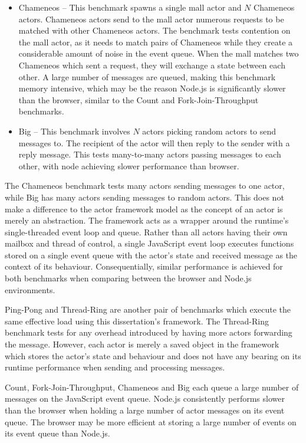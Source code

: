 \documentclass[oneside]{um-fict}
\begin{document}
\begin{itemize}
\item Chameneos – This benchmark spawns a single mall actor and $N$ Chameneos actors. Chameneos actors send to the mall actor numerous requests to be matched with other Chameneos actors. The benchmark tests contention on the mall actor, as it needs to match pairs of Chameneos while they create a considerable amount of noise in the event queue. When the mall matches two Chameneos which sent a request, they will exchange a state between each other. A large number of messages are queued, making this benchmark memory intensive, which may be the reason Node.js is significantly slower than the browser, similar to the Count and Fork-Join-Throughput benchmarks.
\item Big – This benchmark involves $N$ actors picking random actors to send messages to. The recipient of the actor will then reply to the sender with a reply message. This tests many-to-many actors passing messages to each other, with node achieving slower performance than browser.
\end{itemize}
The Chameneos benchmark tests many actors sending messages to one actor, while Big has many actors sending messages to random actors. This does not make a difference to the actor framework model as the concept of an actor is merely an abstraction. The framework acts as a wrapper around the runtime's single-threaded event loop and queue. Rather than all actors having their own mailbox and thread of control, a single JavaScript event loop executes functions stored on a single event queue with the actor's state and received message as the context of its behaviour. Consequentially, similar performance is achieved for both benchmarks when comparing between the browser and Node.js environments.

Ping-Pong and Thread-Ring are another pair of benchmarks which execute the same effective load using this dissertation's framework. The Thread-Ring benchmark tests for any overhead introduced by having more actors forwarding the message. However, each actor is merely a saved object in the framework which stores the actor's state and behaviour and does not have any bearing on its runtime performance when sending and processing messages.

Count, Fork-Join-Throughput, Chameneos and Big each queue a large number of messages on the JavaScript event queue. Node.js consistently performs slower than the browser when holding a large number of actor messages on its event queue. The browser may be more efficient at storing a large number of events on its event queue than Node.js.
\end{document}

